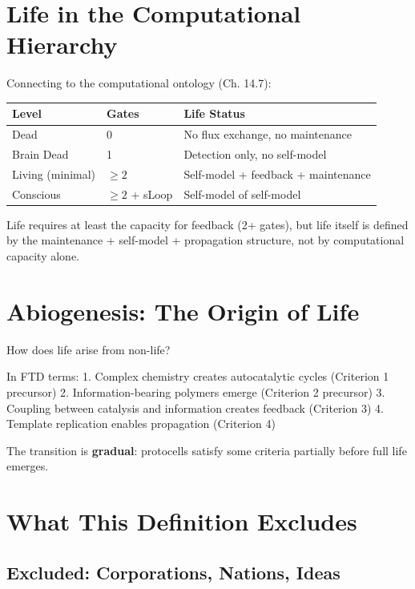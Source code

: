 \documentclass[
  11pt,
  letterpaper,
  twoside,
  openright]{book}
\begin{document}
\section{Life in the Computational
Hierarchy}\label{life-in-the-computational-hierarchy}

Connecting to the computational ontology (Ch. 14.7):

\begin{longtable}[]{@{}lll@{}}
\toprule\noalign{}
Level & Gates & Life Status \\
\midrule\noalign{}
\endhead
\bottomrule\noalign{}
\endlastfoot
Dead & 0 & No flux exchange, no maintenance \\
Brain Dead & 1 & Detection only, no self-model \\
Living (minimal) & \(\geq 2\) & Self-model + feedback + maintenance \\
Conscious & \(\geq 2\) + sLoop & Self-model of self-model \\
\end{longtable}

Life requires at least the capacity for feedback (2+ gates), but life
itself is defined by the maintenance + self-model + propagation
structure, not by computational capacity alone.

\section{Abiogenesis: The Origin of
Life}\label{abiogenesis-the-origin-of-life}

How does life arise from non-life?

In FTD terms: 1. Complex chemistry creates autocatalytic cycles
(Criterion 1 precursor) 2. Information-bearing polymers emerge
(Criterion 2 precursor) 3. Coupling between catalysis and information
creates feedback (Criterion 3) 4. Template replication enables
propagation (Criterion 4)

The transition is \textbf{gradual}: protocells satisfy some criteria
partially before full life emerges.

\section{What This Definition
Excludes}\label{what-this-definition-excludes}

\subsection{Excluded: Corporations, Nations,
Ideas}\label{excluded-corporations-nations-ideas}
\end{document}
